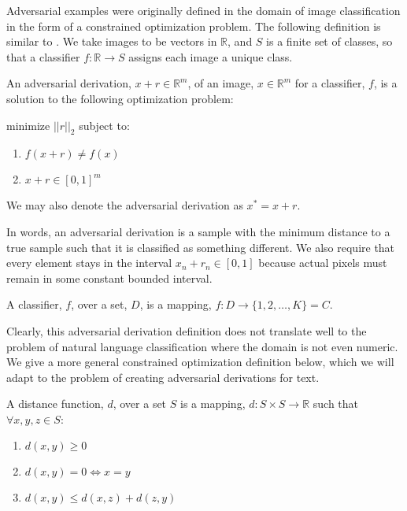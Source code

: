 Adversarial examples were originally defined in the domain of image classification in the form of a constrained optimization problem.  The following definition is similar to \cite{cs14}.  We take images to be vectors in $\mathbb{R}$, and $S$ is a finite set of classes, so that a classifier $f:\mathbb{R}\rightarrow S$ assigns each image a unique class.

\begin{definition}
An adversarial derivation, $x + r \in \mathbb{R}^m$, of an image, $x \in \mathbb{R}^m$ for a classifier, $f$, is a solution to the following optimization problem:
\end{definition}

\noindent
minimize $||r||_2$ subject to:
\begin{enumerate}
\item $f(x + r) \neq f(x)$
\item $x+r \in [0,1]^m$
\end{enumerate}
We may also denote the adversarial derivation as $x^* = x + r$.

\noindent
In words, an adversarial derivation is a sample with the minimum distance to a true sample such that it is classified as something different.  We also require that every element stays in the interval $x_n+r_n \in [0,1]$ because actual pixels must remain in some constant bounded interval.

\begin{definition}
A classifier, $f$, over a set, $D$, is a mapping, $f : D\rightarrow \{1,2,\dots,K\} = C$.
\end{definition}

Clearly, this adversarial derivation definition does not translate well to the problem of natural language classification where the domain is not even numeric.  We give a more general  constrained optimization definition below, which we will adapt to the problem of creating adversarial derivations for text.

\begin{definition}
A distance function, $d$, over a set $S$ is a mapping, $d:S\times S\rightarrow \mathbb{R}$ such that $\forall x,y,z \in S$:
\begin{enumerate}
\itemsep0em
\item $d(x,y) \geq 0$
\item $d(x,y) = 0 \iff x=y$
\item $d(x,y) \leq d(x,z) + d(z,y)$
\end{enumerate}
\end{definition}

